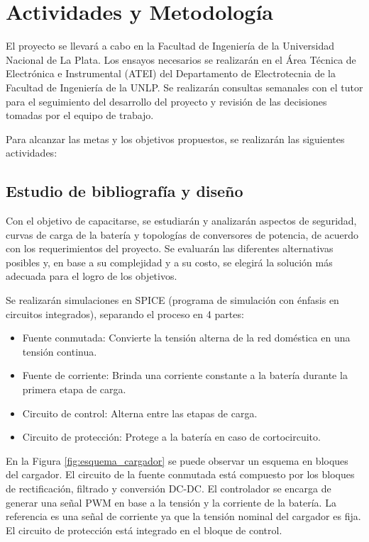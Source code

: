 \section{Actividades y Metodología}


El proyecto se llevará a cabo en la Facultad de Ingeniería de la Universidad Nacional de La Plata.
Los ensayos necesarios se realizarán en el Área Técnica de Electrónica e Instrumental (ATEI)
del Departamento de Electrotecnia de la Facultad de Ingeniería de la UNLP.
Se realizarán consultas semanales con el tutor para el seguimiento del desarrollo del proyecto y
revisión de las decisiones tomadas por el equipo de trabajo.

Para alcanzar las metas y los objetivos propuestos, se realizarán las siguientes actividades:

\subsection{Estudio de bibliografía y diseño} \label{subsection:estudio_bibliografia}
Con el objetivo de capacitarse, se estudiarán y analizarán aspectos de seguridad, curvas de carga de la batería 
y topologías de conversores de potencia, de acuerdo con los requerimientos del proyecto. 
Se evaluarán las diferentes alternativas posibles y, en base a su complejidad y a su costo,
se elegirá la solución más adecuada para el logro de los objetivos. 

Se realizarán simulaciones en SPICE (programa de simulación con énfasis en circuitos integrados),
separando el proceso en 4 partes:
\begin{itemize}
    \item Fuente conmutada: Convierte la tensión alterna de la red doméstica en una tensión continua.
    \item Fuente de corriente: Brinda una corriente constante a la batería durante la primera etapa de carga.
    \item Circuito de control: Alterna entre las etapas de carga.
    \item Circuito de protección: Protege a la batería en caso de cortocircuito.
\end{itemize}

En la Figura \ref{fig:esquema_cargador} se puede observar un esquema en bloques del cargador.
El circuito de la fuente conmutada está compuesto por los bloques de rectificación, filtrado y conversión DC-DC.
El controlador se encarga de generar una señal PWM en base a la tensión y la corriente de la batería.
La referencia es una señal de corriente ya que la tensión nominal del cargador es fija.
El circuito de protección está integrado en el bloque de control.

